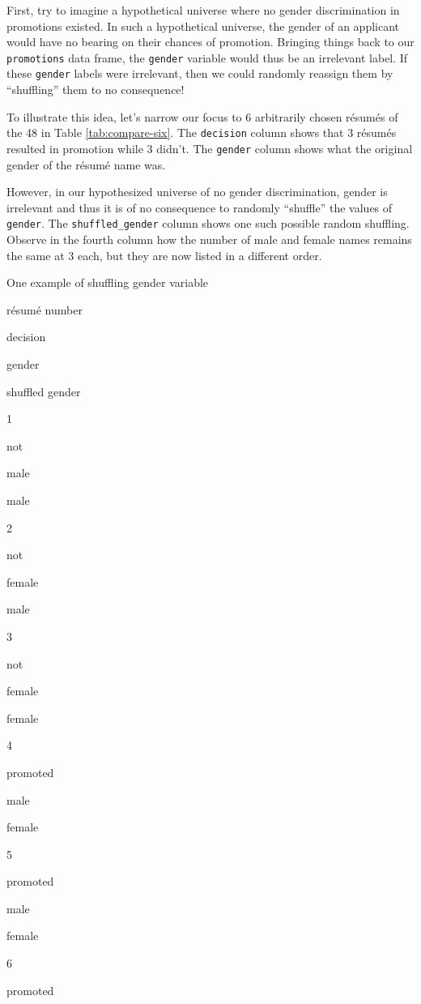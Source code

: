 \documentclass[
]{book}
\begin{document}
First, try to imagine a hypothetical universe where no gender discrimination in promotions existed. In such a hypothetical universe, the gender of an applicant would have no bearing on their chances of promotion. Bringing things back to our \texttt{promotions} data frame, the \texttt{gender} variable would thus be an irrelevant label. If these \texttt{gender} labels were irrelevant, then we could randomly reassign them by ``shuffling'' them to no consequence!

To illustrate this idea, let's narrow our focus to 6 arbitrarily chosen résumés of the 48 in Table \ref{tab:compare-six}. The \texttt{decision} column shows that 3 résumés resulted in promotion while 3 didn't. The \texttt{gender} column shows what the original gender of the résumé name was.

However, in our hypothesized universe of no gender discrimination, gender is irrelevant and thus it is of no consequence to randomly ``shuffle'' the values of \texttt{gender}. The \texttt{shuffled\_gender} column shows one such possible random shuffling. Observe in the fourth column how the number of male and female names remains the same at 3 each, but they are now listed in a different order.

\label{tab:compare-six}One example of shuffling gender variable

résumé number

decision

gender

shuffled gender

1

not

male

male

2

not

female

male

3

not

female

female

4

promoted

male

female

5

promoted

male

female

6

promoted
\end{document}
